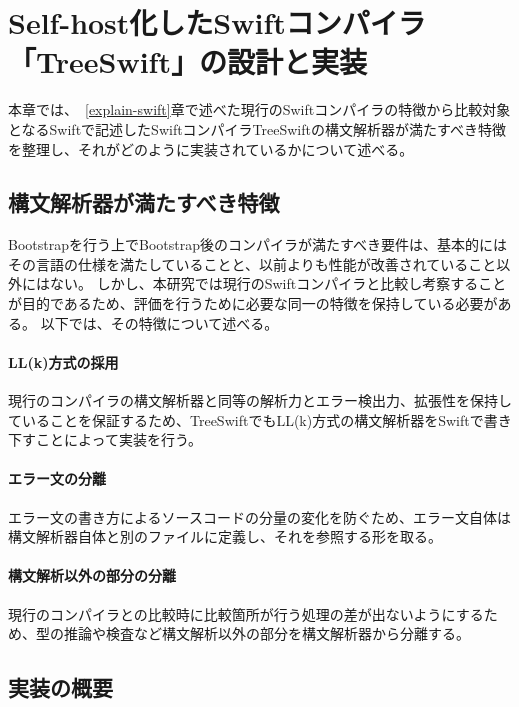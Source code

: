 \chapter{Self-host化したSwiftコンパイラ「TreeSwift」の設計と実装}
\label{treeswift}

本章では、~\ref{explain-swift}章で述べた現行のSwiftコンパイラの特徴から比較対象となるSwiftで記述したSwiftコンパイラTreeSwiftの構文解析器が満たすべき特徴を整理し、それがどのように実装されているかについて述べる。

\section{構文解析器が満たすべき特徴}
\label{treeswift:requirements}

Bootstrapを行う上でBootstrap後のコンパイラが満たすべき要件は、基本的にはその言語の仕様を満たしていることと、以前よりも性能が改善されていること以外にはない。
しかし、本研究では現行のSwiftコンパイラと比較し考察することが目的であるため、評価を行うために必要な同一の特徴を保持している必要がある。
以下では、その特徴について述べる。

\subsubsection{LL(k)方式の採用}

現行のコンパイラの構文解析器と同等の解析力とエラー検出力、拡張性を保持していることを保証するため、TreeSwiftでもLL(k)方式の構文解析器をSwiftで書き下すことによって実装を行う。

\subsubsection{エラー文の分離}

エラー文の書き方によるソースコードの分量の変化を防ぐため、エラー文自体は構文解析器自体と別のファイルに定義し、それを参照する形を取る。

\subsubsection{構文解析以外の部分の分離}

現行のコンパイラとの比較時に比較箇所が行う処理の差が出ないようにするため、型の推論や検査など構文解析以外の部分を構文解析器から分離する。


\section{実装の概要}


